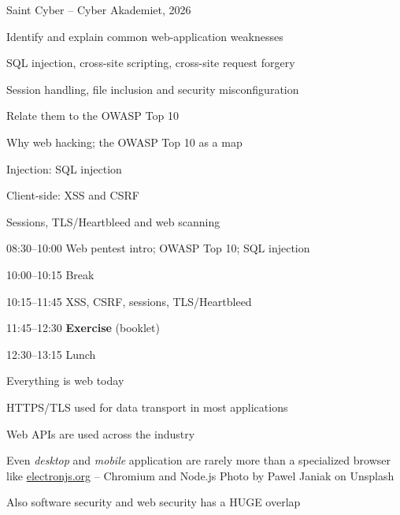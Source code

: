 \documentclass[Screen16to9,17pt]{foils}
\begin{document}
{Saint Cyber -- Cyber Akademiet, 2026}

\begin{list2}
\item Identify and explain common web-application weaknesses
\item SQL injection, cross-site scripting, cross-site request forgery
\item Session handling, file inclusion and security misconfiguration
\item Relate them to the OWASP Top 10
\end{list2}

\begin{list2}
\item Why web hacking; the OWASP Top 10 as a map
\item Injection: SQL injection
\item Client-side: XSS and CSRF
\item Sessions, TLS/Heartbleed and web scanning
\end{list2}

\begin{list2}
\item 08:30--10:00 Web pentest intro; OWASP Top 10; SQL injection
\item 10:00--10:15 Break
\item 10:15--11:45 XSS, CSRF, sessions, TLS/Heartbleed
\item 11:45--12:30 \textbf{Exercise} (booklet)
\item 12:30--13:15 Lunch
\end{list2}



\begin{list2}
\item Everything is web today
\item HTTPS/TLS used for data transport in most applications
\item Web APIs are used across the industry
\item Even \emph{desktop} and \emph{mobile} application are rarely more than a specialized browser\\ like \url{electronjs.org} -- Chromium and Node.js
\hfill {\footnotesize Photo by Pawel Janiak on Unsplash}
\item Also software security and web security has a HUGE overlap
\end{list2}
\end{document}
